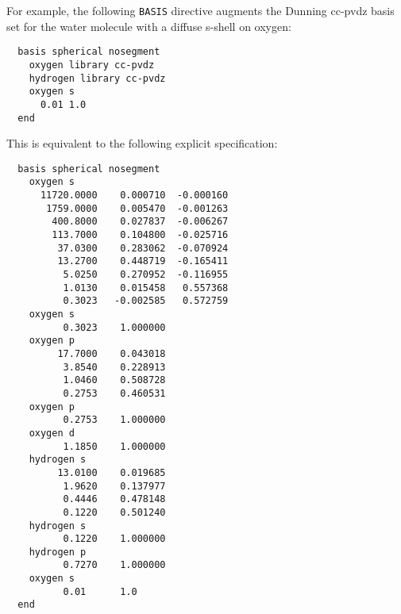 For example, the following \verb+BASIS+ directive augments the Dunning
cc-pvdz basis set for the water molecule with a diffuse s-shell on
oxygen:
\begin{verbatim}
  basis spherical nosegment
    oxygen library cc-pvdz
    hydrogen library cc-pvdz
    oxygen s
      0.01 1.0
  end
\end{verbatim}

This is equivalent to the following explicit specification:
\begin{verbatim}
  basis spherical nosegment
    oxygen s
      11720.0000    0.000710  -0.000160
       1759.0000    0.005470  -0.001263
        400.8000    0.027837  -0.006267
        113.7000    0.104800  -0.025716
         37.0300    0.283062  -0.070924
         13.2700    0.448719  -0.165411
          5.0250    0.270952  -0.116955
          1.0130    0.015458   0.557368
          0.3023   -0.002585   0.572759
    oxygen s                
          0.3023    1.000000
    oxygen p                
         17.7000    0.043018
          3.8540    0.228913
          1.0460    0.508728
          0.2753    0.460531
    oxygen p                
          0.2753    1.000000
    oxygen d
          1.1850    1.000000
    hydrogen s
         13.0100    0.019685
          1.9620    0.137977
          0.4446    0.478148
          0.1220    0.501240
    hydrogen s  
          0.1220    1.000000
    hydrogen p  
          0.7270    1.000000
    oxygen s
          0.01      1.0
  end
\end{verbatim}




